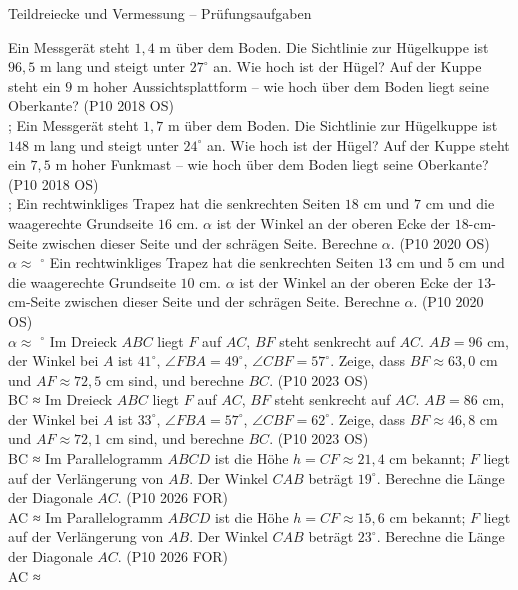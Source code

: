 \begin{aufgabe}{Teildreiecke und Vermessung – Prüfungsaufgaben}
\begin{teile}
\teil Ein Messgerät steht $1{,}4$ m über dem Boden. Die Sichtlinie zur Hügelkuppe ist $96{,}5$ m lang und steigt unter $27^\circ$ an. Wie hoch ist der Hügel? Auf der Kuppe steht ein $9$ m hoher Aussichtsplattform – wie hoch über dem Boden liegt seine Oberkante? \hfill (P10 2018 OS) \\ \leerfeld[m] ; \leerfeld[m]
\teil Ein Messgerät steht $1{,}7$ m über dem Boden. Die Sichtlinie zur Hügelkuppe ist $148$ m lang und steigt unter $24^\circ$ an. Wie hoch ist der Hügel? Auf der Kuppe steht ein $7{,}5$ m hoher Funkmast – wie hoch über dem Boden liegt seine Oberkante? \hfill (P10 2018 OS) \\ \leerfeld[m] ; \leerfeld[m]
\teil Ein rechtwinkliges Trapez hat die senkrechten Seiten $18$ cm und $7$ cm und die waagerechte Grundseite $16$ cm. $\alpha$ ist der Winkel an der oberen Ecke der $18$-cm-Seite zwischen dieser Seite und der schrägen Seite. Berechne $\alpha$. \hfill (P10 2020 OS) \\ $\alpha \approx$ \leerfeld $^\circ$
\teil Ein rechtwinkliges Trapez hat die senkrechten Seiten $13$ cm und $5$ cm und die waagerechte Grundseite $10$ cm. $\alpha$ ist der Winkel an der oberen Ecke der $13$-cm-Seite zwischen dieser Seite und der schrägen Seite. Berechne $\alpha$. \hfill (P10 2020 OS) \\ $\alpha \approx$ \leerfeld $^\circ$
\teil Im Dreieck $ABC$ liegt $F$ auf $AC$, $BF$ steht senkrecht auf $AC$. $AB = 96$ cm, der Winkel bei $A$ ist $41^\circ$, $\angle FBA = 49^\circ$, $\angle CBF = 57^\circ$. Zeige, dass $BF \approx 63{,}0$ cm und $AF \approx 72{,}5$ cm sind, und berechne $BC$. \hfill (P10 2023 OS) \\ BC ≈ \leerfeld[cm]
\teil Im Dreieck $ABC$ liegt $F$ auf $AC$, $BF$ steht senkrecht auf $AC$. $AB = 86$ cm, der Winkel bei $A$ ist $33^\circ$, $\angle FBA = 57^\circ$, $\angle CBF = 62^\circ$. Zeige, dass $BF \approx 46{,}8$ cm und $AF \approx 72{,}1$ cm sind, und berechne $BC$. \hfill (P10 2023 OS) \\ BC ≈ \leerfeld[cm]
\teil Im Parallelogramm $ABCD$ ist die Höhe $h = CF \approx 21{,}4$ cm bekannt; $F$ liegt auf der Verlängerung von $AB$. Der Winkel $CAB$ beträgt $19^\circ$. Berechne die Länge der Diagonale $AC$. \hfill (P10 2026 FOR) \\ AC ≈ \leerfeld[cm]
\teil Im Parallelogramm $ABCD$ ist die Höhe $h = CF \approx 15{,}6$ cm bekannt; $F$ liegt auf der Verlängerung von $AB$. Der Winkel $CAB$ beträgt $23^\circ$. Berechne die Länge der Diagonale $AC$. \hfill (P10 2026 FOR) \\ AC ≈ \leerfeld[cm]

\end{teile}
\end{aufgabe}
